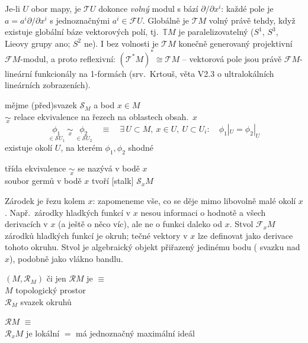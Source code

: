 \begin{vysvetleni}
Je-li $U$ obor mapy, je $\mathcal{T}U$ dokonce \emph{volný} modul s bází $\partial/\partial x^i$: každé pole je $a=a^i\partial/\partial x^i$ s jednoznačnými $a^i\in\mathcal{F}U$.
Globálně je $\mathcal{T}M$ volný právě tehdy, když existuje globální báze vektorových polí, tj.\ $\mathbb{T}M$ je paralelizovatelný ($S^1$, $S^3$, Lieovy grupy ano; $S^2$ ne).
I bez volnosti je $\mathcal{T}M$ konečně generovaný projektivní $\mathcal{F}M$-modul, a proto reflexivní: $(\mathcal{T}^*M)^*\cong\mathcal{T}M$ -- vektorová pole jsou
právě $\mathcal{F}M$-lineární funkcionály na 1-formách (srv.\ Krtouš, věta V2.3 o ultralokálních lineárních zobrazeních).
\end{vysvetleni}

\newpage
{}
\begin{definice}
mějme (před)svazek $\mathcal{S}_M$ a bod $x\in M$ \\
$\underset{x}{\sim}$ relace ekvivalence na řezech na oblastech obsah.\ $x$
\[
  \underset{\in\mathcal{S}U_1}{\phi_1}\ \underset{x}{\sim}\ \underset{\in\mathcal{S}U_2}{\phi_2}
  \quad\equiv\quad
  \exists\, U\subset M,\ x\in U,\ U\subset U_i:\quad \phi_1|_U = \phi_2|_U
\]
\hfill existuje okolí $U$, na kterém $\phi_1,\phi_2$ shodné

třída ekvivalence $\underset{x}{\sim}$ se nazývá  v bodě $x$ \\
soubor germů v bodě $x$ tvoří  [stalk] $\mathcal{S}_xM$
\end{definice}

\begin{vysvetleni}[Zárodky]
Zárodek je  řezu kolem $x$: zapomeneme vše, co se děje mimo libovolně malé okolí $x$. Např.\ zárodky hladkých funkcí v $x$
nesou informaci o hodnotě a všech derivacích v $x$ (a ještě o něco víc), ale ne o funkci daleko od $x$. Stvol $\mathcal{F}_xM$ zárodků hladkých funkcí je okruh;
tečné vektory v $x$ lze definovat jako derivace tohoto okruhu. Stvol je algebraický objekt přiřazený jedinému bodu ( svazku nad $x$),
podobně jako vlákno bandlu.
\end{vysvetleni}

\begin{definice}
$(M,\mathcal{R}_M)$ či jen $\mathcal{R}M$ je  $\equiv$ \\
\quad $M$ \quad topologický prostor \\
\quad $\mathcal{R}_M$ \quad svazek okruhů

 $\mathcal{R}M$ $\equiv$ \\
\quad $\mathcal{R}_xM$ je lokální $=$ má jednoznačný maximální ideál
\end{definice}

